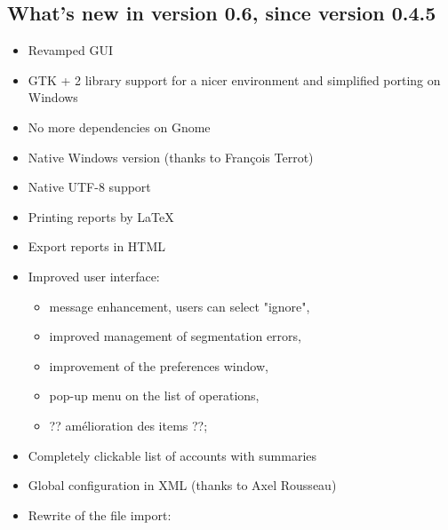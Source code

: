 \newpage

\subsection{What's new in version 0.6, since version 0.4.5}

\begin{itemize}

\item Revamped GUI

\item GTK + 2 library support for a nicer environment and simplified porting on Windows

\item No more dependencies on Gnome

\item Native Windows version (thanks to François Terrot)

\item Native \gls{UTF-8} support 

\item Printing reports by \gls{LaTeX}

\item Export reports in \gls{HTML}

\item Improved user interface:

\begin{itemize}

\item message enhancement, users can select "ignore",

\item improved management of segmentation errors,

\item improvement of the preferences window,

\item pop-up menu on the list of operations,

\item ?? amélioration des items ??;

\end{itemize}

\item Completely clickable list of accounts with summaries

\item Global configuration in \gls{XML} (thanks to Axel Rousseau)

\item Rewrite of the file import:


\end{itemize}
